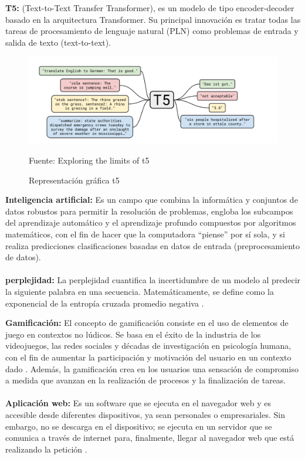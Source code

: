 \textbf{T5: }(Text-to-Text Transfer Transformer), es un modelo de tipo encoder-decoder basado en la arquitectura Transformer. Su principal innovación es tratar todas las tareas de procesamiento de lenguaje natural (PLN) como problemas de entrada y salida de texto (text-to-text).

\begin{figure}[H]
  \centering
  \includegraphics[width=0.7\linewidth]{Imagenes/t5.png}
  \caption{Representación gráfica t5}
  Fuente: Exploring the limits of t5 \cite{transferttt}
  \label{fig:t5_summary}
\end{figure}

\textbf{Inteligencia artificial: } Es un campo que combina la informática y conjuntos de datos robustos para permitir la resolución de problemas, engloba los subcampos del aprendizaje automático y el aprendizaje profundo \cite{ibm_ia} compuestos por algoritmos matemáticos, con el fin de hacer que la computadora “piense” por sí sola, y si realiza predicciones clasificaciones basadas en datos de entrada (preprocesamiento de datos).
\\
\\
\textbf{perplejidad: }
La perplejidad cuantifica la incertidumbre de un modelo al predecir la siguiente palabra en una secuencia. Matemáticamente, se define como la exponencial de la entropía cruzada promedio negativa \cite{huggperplexity}.

\textbf{Gamificación: } El concepto de gamificación consiste en el uso de elementos de juego en contextos no lúdicos. Se basa en el éxito de la industria de los videojuegos, las redes sociales y décadas de investigación en psicología humana, con el fin de aumentar la participación y motivación del usuario en un contexto dado \cite{flores2015using}. Además, la gamificación crea en los usuarios una sensación de compromiso a medida que avanzan en la realización de procesos y la finalización de tareas.
\\
\\
\textbf{Aplicación web: } Es un software que se ejecuta en el navegador web y es accesible desde diferentes dispositivos, ya sean personales o empresariales. Sin embargo, no se descarga en el dispositivo; se ejecuta en un servidor que se comunica a través de internet para, finalmente, llegar al navegador web que está realizando la petición \cite{aws_webapp}.
